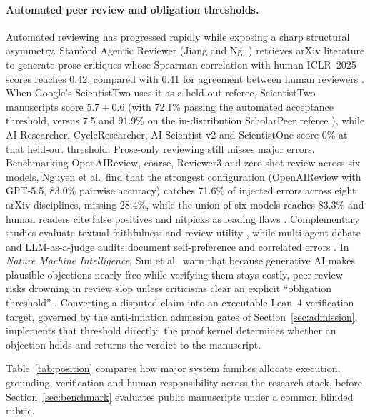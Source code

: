 \documentclass[11pt,a4paper]{article}
\newcommand{\code}[1]{\texttt{\detokenize{#1}}}
\begin{document}
\paragraph{Automated peer review and obligation thresholds.}
Automated reviewing has progressed rapidly while exposing a sharp structural
asymmetry. Stanford Agentic Reviewer (Jiang and Ng; \code{paperreview.ai})
retrieves arXiv literature to generate prose critiques whose Spearman
correlation with human ICLR~2025 scores reaches 0.42, compared with 0.41 for
agreement between human reviewers \citep{stanford}. When Google's ScientistTwo
uses it as a held-out referee, ScientistTwo manuscripts score $5.7\pm0.6$ (with
72.1\% passing the automated acceptance threshold, versus 7.5 and 91.9\% on the
in-distribution ScholarPeer referee \citep{scientisttwo,scholarpeer}), while
AI-Researcher, CycleResearcher, AI Scientist-v2 and ScientistOne score 0\% at
that held-out threshold. Prose-only reviewing still misses major errors.
Benchmarking OpenAIReview, coarse, Reviewer3 and zero-shot review across six
models, Nguyen et al.\ find that the strongest configuration (OpenAIReview with
GPT-5.5, 83.0\% pairwise accuracy) catches 71.6\% of injected errors across
eight arXiv disciplines, missing 28.4\%, while the union of six models reaches
83.3\% and human readers cite false positives and nitpicks as leading flaws
\citep{nguyen2026review}. Complementary studies evaluate textual faithfulness
and review utility \citep{li2026beyond,thakkar}, while multi-agent debate and
LLM-as-a-judge audits document self-preference and correlated errors
\citep{du,huang,panickssery,zheng2023judge}. In \emph{Nature Machine
Intelligence}, Sun et al.\ warn that because generative AI makes plausible
objections nearly free while verifying them stays costly, peer review risks
drowning in review slop unless criticisms clear an explicit ``obligation
threshold'' \citep{sun2026obligation}. Converting a disputed claim into an
executable Lean~4 verification target, governed by the anti-inflation admission
gates of Section~\ref{sec:admission}, implements that threshold directly: the
proof kernel determines whether an objection holds and returns the verdict to
the manuscript.

Table~\ref{tab:position} compares how major system families allocate execution,
grounding, verification and human responsibility across the research stack,
before Section~\ref{sec:benchmark} evaluates public manuscripts under a common
blinded rubric.
\end{document}
